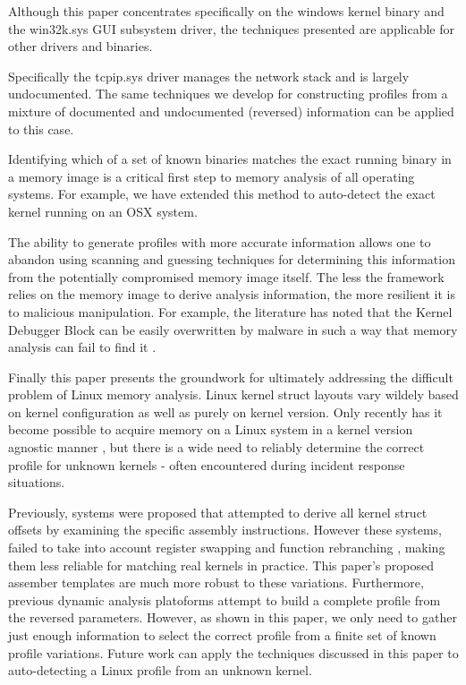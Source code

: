 Although this paper concentrates specifically on the windows kernel binary and
the win32k.sys GUI subsystem driver, the techniques presented are applicable for
other drivers and binaries.

Specifically the tcpip.sys driver manages the network stack and is largely
undocumented. The same techniques we develop for constructing profiles from a
mixture of documented and undocumented (reversed) information can be applied to
this case.

Identifying which of a set of known binaries matches the exact running binary in
a memory image is a critical first step to memory analysis of all operating
systems. For example, we have extended this method to auto-detect the exact
kernel running on an OSX system.

The ability to generate profiles with more accurate information allows one to
abandon using scanning and guessing techniques for determining this information
from the potentially compromised memory image itself. The less the framework
relies on the memory image to derive analysis information, the more resilient it
is to malicious manipulation. For example, the literature has noted that the
Kernel Debugger Block can be easily overwritten by malware in such a way that
memory analysis can fail to find it \cite{haruyama2012one}.

Finally this paper presents the groundwork for ultimately addressing the
difficult problem of Linux memory analysis. Linux kernel struct layouts vary
wildely based on kernel configuration as well as purely on kernel version. Only
recently has it become possible to acquire memory on a Linux system in a kernel
version agnostic manner \citep{stuttgen2014robust}, but there is a wide need to
reliably determine the correct profile for unknown kernels - often encountered
during incident response situations.

Previously, systems were proposed that attempted to derive all kernel struct
offsets by examining the specific assembly instructions. However these systems,
failed to take into account register swapping and function rebranching
\cite{case2010dynamic}, making them less reliable for matching real kernels in
practice. This paper's proposed assember templates are much more robust to these
variations. Furthermore, previous dynamic analysis platoforms attempt to build a
complete profile from the reversed parameters. However, as shown in this paper,
we only need to gather just enough information to select the correct profile
from a finite set of known profile variations. Future work can apply the
techniques discussed in this paper to auto-detecting a Linux profile from an
unknown kernel.
